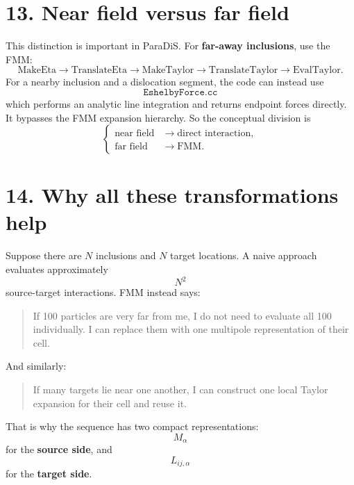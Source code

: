 \documentclass[11pt,a4paper]{article}
\begin{document}
\section*{13. Near field versus far field}
This distinction is important in ParaDiS.
For \textbf{far-away inclusions}, use the FMM:
\[\boxed{\text{MakeEta}\rightarrow\text{TranslateEta}\rightarrow\text{MakeTaylor}\rightarrow\text{TranslateTaylor}\rightarrow\text{EvalTaylor}.}\]
For a nearby inclusion and a dislocation segment, the code can instead use
\[\boxed{\texttt{EshelbyForce.cc}}\]
which performs an analytic line integration and returns endpoint forces directly. It bypasses the FMM expansion hierarchy.
So the conceptual division is
\[\boxed{\begin{cases}\text{near field} &\rightarrow \text{direct interaction},\\[3pt]\text{far field} &\rightarrow \text{FMM}.\end{cases}}\]

\section*{14. Why all these transformations help}
Suppose there are \(N\) inclusions and \(N\) target locations.
A naive approach evaluates approximately
\[N^2\]
source-target interactions.
FMM instead says:
\begin{quote}
If 100 particles are very far from me, I do not need to evaluate all 100 individually. I can replace them with one multipole representation of their cell.
\end{quote}
And similarly:
\begin{quote}
If many targets lie near one another, I can construct one local Taylor expansion for their cell and reuse it.
\end{quote}
That is why the sequence has two compact representations:
\[\boxed{M_\alpha}\]
for the \textbf{source side}, and
\[\boxed{L_{ij,\alpha}}\]
for the \textbf{target side}.
\end{document}
